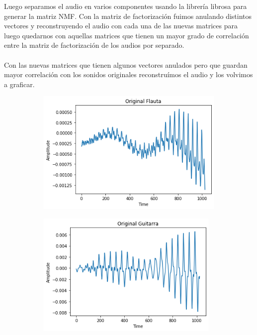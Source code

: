 Luego separamos el audio en varios componentes usando la librer\'ia librosa para generar la matriz NMF. Con la matriz de factorizaci\'on fuimos anulando distintos vectores y reconstruyendo el audio con cada una de las nuevas matrices para luego quedarnos con aquellas matrices que tienen un mayor grado de correlaci\'on entre la matriz de factorizaci\'on de los audios por separado.
\\
\\
Con las nuevas matrices que tienen algunos vectores anulados pero que guardan mayor correlaci\'on con los sonidos originales reconstru\'imos el audio y los volvimos a graficar.

\begin{figure}[h!]
    \begin{subfigure}{0.5\textwidth}
        \centering
        \includegraphics[height=60mm]{Content/Figures/separacion_audio1.png}
    \end{subfigure}
    \begin{subfigure}{0.5\textwidth}
        \centering
        \includegraphics[height=60mm]{Content/Figures/separacion_audio2.png}
    \end{subfigure}
\end{figure}
